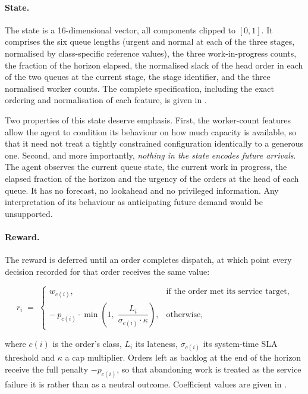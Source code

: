 \paragraph{State.} The state is a 16-dimensional vector, all components clipped to
\([0,1]\). It comprises the six queue lengths (urgent and normal at each of the three stages,
normalised by class-specific reference values), the three work-in-progress counts, the fraction
of the horizon elapsed, the normalised slack of the head order in each of the two queues at the
current stage, the stage identifier, and the three normalised worker counts. The complete
specification, including the exact ordering and normalisation of each feature, is given in
.

Two properties of this state deserve emphasis. First, the worker-count features allow the agent
to condition its behaviour on how much capacity is available, so that it need not treat a
tightly constrained configuration identically to a generous one. Second, and more importantly,
\emph{nothing in the state encodes future arrivals}. The agent observes the current queue
state, the current work in progress, the elapsed fraction of the horizon and the urgency of the
orders at the head of each queue. It has no forecast, no lookahead and no privileged
information. Any interpretation of its behaviour as anticipating future demand would be
unsupported.

\paragraph{Reward.} The reward is deferred until an order completes dispatch, at which point
every decision recorded for that order receives the same value:

\begin{equation}
r_i \;=\;
\begin{cases}
w_{c(i)}, & \text{if the order met its service target,}\\[4pt]
-\,p_{c(i)} \cdot \min\!\left(1,\; \dfrac{L_i}{\sigma_{c(i)} \cdot \kappa}\right), & \text{otherwise,}
\end{cases}
\label{eq:reward}
\end{equation}

\noindent where \(c(i)\) is the order's class, \(L_i\) its lateness, \(\sigma_{c(i)}\) its
system-time SLA threshold and \(\kappa\) a cap multiplier. Orders left as backlog at the end of the
horizon receive the full penalty \(-p_{c(i)}\), so that abandoning work is treated as the
service failure it is rather than as a neutral outcome. Coefficient values are given in
.

